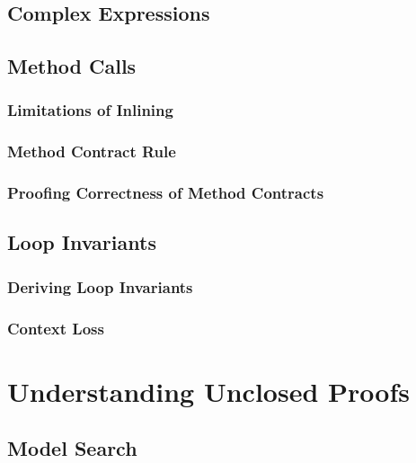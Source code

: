 \documentclass[a4paper, 11pt, accentcolor = tud3b]{tudreport}
\begin{document}
			\subsection{Complex Expressions} %

			\subsection{Method Calls} %

				\subsubsection{Limitations of Inlining} %

				\subsubsection{Method Contract Rule} %

				\subsubsection{Proofing Correctness of Method Contracts} %

			\subsection{Loop Invariants} %

				\subsubsection{Deriving Loop Invariants} %

				\subsubsection{Context Loss} %

		\section{Understanding Unclosed Proofs} %

			\subsection{Model Search} %
	
\end{document}
